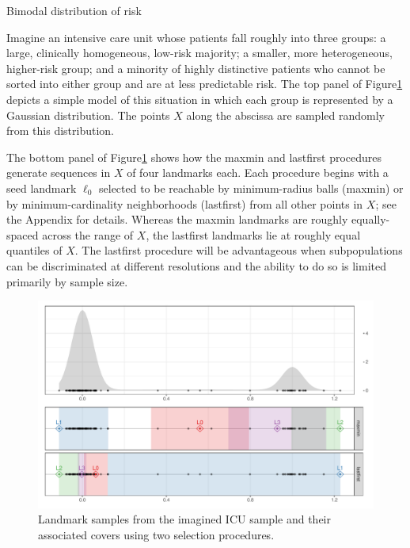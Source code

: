 \documentclass{article}
\begin{document}
\begin{example}{Bimodal distribution of risk}

Imagine an intensive care unit whose patients fall roughly into three groups: a large, clinically homogeneous, low-risk majority; a smaller, more heterogeneous, higher-risk group; and a minority of highly distinctive patients who cannot be sorted into either group and are at less predictable risk.
The top panel of Figure\nbs\ref{fig:icu-cover} depicts a simple model of this situation in which each group is represented by a Gaussian distribution.
The points $X$ along the abscissa are sampled randomly from this distribution.

The bottom panel of Figure\nbs\ref{fig:icu-cover} shows how the maxmin and lastfirst procedures generate sequences in $X$ of four landmarks each.
Each procedure begins with a seed landmark $\ell_0$ selected to be reachable by minimum-radius balls (maxmin) or by minimum-cardinality neighborhoods (lastfirst) from all other points in $X$; see the Appendix for details.
Whereas the maxmin landmarks are roughly equally-spaced across the range of $X$, the lastfirst landmarks lie at roughly equal quantiles of $X$.
The lastfirst procedure will be advantageous when subpopulations can be discriminated at different resolutions and the ability to do so is limited primarily by sample size.

\begin{figure}
\includegraphics[width=\textwidth]{vardens-cover}
\caption{
Landmark samples from the imagined ICU sample and their associated covers using two selection procedures.
\label{fig:icu-cover}
}
\end{figure}

\end{example}
\end{document}
